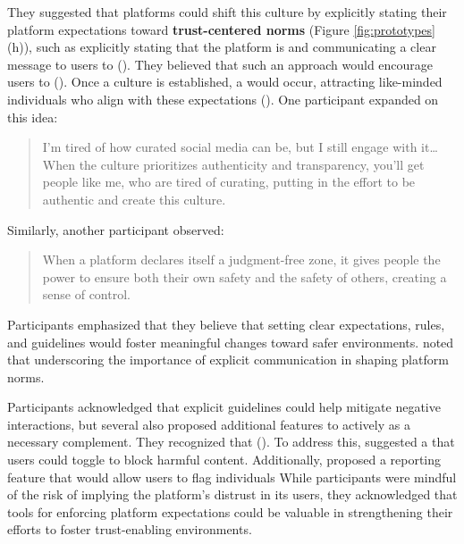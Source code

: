 They suggested that platforms could shift this culture by explicitly stating their platform expectations toward \textbf{trust-centered norms} (Figure \ref{fig:prototypes} (h)), such as explicitly stating that the platform is  and communicating a clear message to users to  (). They believed that such an approach would encourage users to  (). Once a culture is established, a  would occur, attracting like-minded individuals who align with these expectations (). One participant expanded on this idea: 
\blockquote{I'm tired of how curated social media can be, but I still engage with it\ldots{} When the culture prioritizes authenticity and transparency, you'll get people like me, who are tired of curating, putting in the effort to be authentic and create this culture.}{}
Similarly, another participant observed:
\blockquote{When a platform declares itself a judgment-free zone, it gives people the power to ensure both their own safety and the safety of others, creating a sense of control.}{}
Participants emphasized that they believe that setting clear expectations, rules, and guidelines would foster meaningful changes toward safer environments.  noted that  underscoring the importance of explicit communication in shaping platform norms.

Participants acknowledged that explicit guidelines could help mitigate negative interactions, but several also proposed additional features to actively  as a necessary complement. They recognized that  (). To address this,  suggested a  that users could toggle to block harmful content. Additionally,  proposed a reporting feature that would allow users to flag individuals  While participants were mindful of the risk of implying the platform's distrust in its users, they acknowledged that tools for enforcing platform expectations could be valuable in strengthening their efforts to foster trust-enabling environments.
